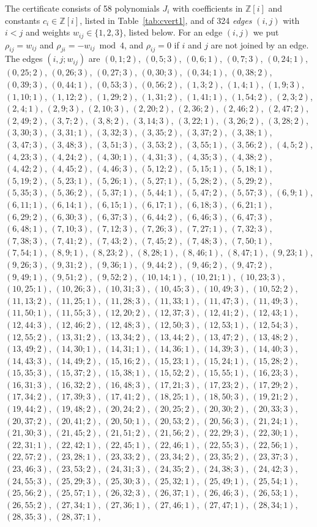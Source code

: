 \documentclass[11pt]{article}
\newcommand{\Z}{\mathbb{Z}}
\begin{document}
The certificate consists of 58 polynomials $J_i$ with coefficients in $\Z[i]$ and constants $c_i\in\Z[i]$, listed in Table~\ref{tab:cvert1}, and of 324 \emph{edges} $(i,j)$ with $i<j$ and weights $w_{ij}\in\{1,2,3\}$, listed below. For an edge $(i,j)$ we put $\rho_{ij}=w_{ij}$ and $\rho_{ji}=-w_{ij}\bmod 4$, and $\rho_{ij}=0$ if $i$ and $j$ are not joined by an edge.
The edges $(i,j;w_{ij})$ are $(0,1;2)$, $(0,5;3)$, $(0,6;1)$, $(0,7;3)$, $(0,24;1)$, $(0,25;2)$, $(0,26;3)$, $(0,27;3)$, $(0,30;3)$, $(0,34;1)$, $(0,38;2)$, $(0,39;3)$, $(0,44;1)$, $(0,53;3)$, $(0,56;2)$, $(1,3;2)$, $(1,4;1)$, $(1,9;3)$, $(1,10;1)$, $(1,12;2)$, $(1,29;2)$, $(1,31;2)$, $(1,41;1)$, $(1,54;2)$, $(2,3;2)$, $(2,4;1)$, $(2,9;3)$, $(2,10;3)$, $(2,20;2)$, $(2,36;2)$, $(2,46;2)$, $(2,47;2)$, $(2,49;2)$, $(3,7;2)$, $(3,8;2)$, $(3,14;3)$, $(3,22;1)$, $(3,26;2)$, $(3,28;2)$, $(3,30;3)$, $(3,31;1)$, $(3,32;3)$, $(3,35;2)$, $(3,37;2)$, $(3,38;1)$, $(3,47;3)$, $(3,48;3)$, $(3,51;3)$, $(3,53;2)$, $(3,55;1)$, $(3,56;2)$, $(4,5;2)$, $(4,23;3)$, $(4,24;2)$, $(4,30;1)$, $(4,31;3)$, $(4,35;3)$, $(4,38;2)$, $(4,42;2)$, $(4,45;2)$, $(4,46;3)$, $(5,12;2)$, $(5,15;1)$, $(5,18;1)$, $(5,19;2)$, $(5,23;1)$, $(5,26;1)$, $(5,27;1)$, $(5,28;2)$, $(5,29;2)$, $(5,35;3)$, $(5,36;2)$, $(5,37;1)$, $(5,44;1)$, $(5,47;2)$, $(5,57;3)$, $(6,9;1)$, $(6,11;1)$, $(6,14;1)$, $(6,15;1)$, $(6,17;1)$, $(6,18;3)$, $(6,21;1)$, $(6,29;2)$, $(6,30;3)$, $(6,37;3)$, $(6,44;2)$, $(6,46;3)$, $(6,47;3)$, $(6,48;1)$, $(7,10;3)$, $(7,12;3)$, $(7,26;3)$, $(7,27;1)$, $(7,32;3)$, $(7,38;3)$, $(7,41;2)$, $(7,43;2)$, $(7,45;2)$, $(7,48;3)$, $(7,50;1)$, $(7,54;1)$, $(8,9;1)$, $(8,23;2)$, $(8,28;1)$, $(8,46;1)$, $(8,47;1)$, $(9,23;1)$, $(9,26;3)$, $(9,31;2)$, $(9,36;1)$, $(9,44;2)$, $(9,46;2)$, $(9,47;2)$, $(9,49;1)$, $(9,51;2)$, $(9,52;2)$, $(10,14;1)$, $(10,21;1)$, $(10,23;3)$, $(10,25;1)$, $(10,26;3)$, $(10,31;3)$, $(10,45;3)$, $(10,49;3)$, $(10,52;2)$, $(11,13;2)$, $(11,25;1)$, $(11,28;3)$, $(11,33;1)$, $(11,47;3)$, $(11,49;3)$, $(11,50;1)$, $(11,55;3)$, $(12,20;2)$, $(12,37;3)$, $(12,41;2)$, $(12,43;1)$, $(12,44;3)$, $(12,46;2)$, $(12,48;3)$, $(12,50;3)$, $(12,53;1)$, $(12,54;3)$, $(12,55;2)$, $(13,31;2)$, $(13,34;2)$, $(13,44;2)$, $(13,47;2)$, $(13,48;2)$, $(13,49;2)$, $(14,30;1)$, $(14,31;1)$, $(14,36;1)$, $(14,39;3)$, $(14,40;3)$, $(14,43;3)$, $(14,49;2)$, $(15,16;2)$, $(15,23;1)$, $(15,24;1)$, $(15,28;2)$, $(15,35;3)$, $(15,37;2)$, $(15,38;1)$, $(15,52;2)$, $(15,55;1)$, $(16,23;3)$, $(16,31;3)$, $(16,32;2)$, $(16,48;3)$, $(17,21;3)$, $(17,23;2)$, $(17,29;2)$, $(17,34;2)$, $(17,39;3)$, $(17,41;2)$, $(18,25;1)$, $(18,50;3)$, $(19,21;2)$, $(19,44;2)$, $(19,48;2)$, $(20,24;2)$, $(20,25;2)$, $(20,30;2)$, $(20,33;3)$, $(20,37;2)$, $(20,41;2)$, $(20,50;1)$, $(20,53;2)$, $(20,56;3)$, $(21,24;1)$, $(21,30;3)$, $(21,45;2)$, $(21,51;2)$, $(21,56;2)$, $(22,29;3)$, $(22,30;1)$, $(22,31;1)$, $(22,42;1)$, $(22,45;1)$, $(22,46;1)$, $(22,55;3)$, $(22,56;1)$, $(22,57;2)$, $(23,28;1)$, $(23,33;2)$, $(23,34;2)$, $(23,35;2)$, $(23,37;3)$, $(23,46;3)$, $(23,53;2)$, $(24,31;3)$, $(24,35;2)$, $(24,38;3)$, $(24,42;3)$, $(24,55;3)$, $(25,29;3)$, $(25,30;3)$, $(25,32;1)$, $(25,49;1)$, $(25,54;1)$, $(25,56;2)$, $(25,57;1)$, $(26,32;3)$, $(26,37;1)$, $(26,46;3)$, $(26,53;1)$, $(26,55;2)$, $(27,34;1)$, $(27,36;1)$, $(27,46;1)$, $(27,47;1)$, $(28,34;1)$, $(28,35;3)$, $(28,37;1)$, 
\end{document}
